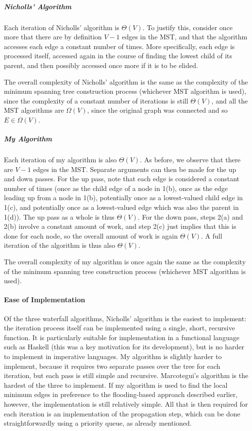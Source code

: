 \subparagraph{Nicholls' Algorithm}

Each iteration of Nicholls' algorithm is $\Theta(V)$. To justify this, consider once more that there are by definition $V - 1$ edges in the MST, and that the algorithm accesses each edge a constant number of times. More specifically, each edge is processed itself, accessed again in the course of finding the lowest child of its parent, and then possibly accessed once more if it is to be elided.

The overall complexity of Nicholls' algorithm is the same as the complexity of the minimum spanning tree construction process (whichever MST algorithm is used), since the complexity of a constant number of iterations is still $\Theta(V)$, and all the MST algorithms are $\Omega(V)$, since the original graph was connected and so $E \in \Omega(V)$.

\subparagraph{My Algorithm}

Each iteration of my algorithm is also $\Theta(V)$. As before, we observe that there are $V - 1$ edges in the MST. Separate arguments can then be made for the up and down passes. For the up pass, note that each edge is considered a constant number of times (once as the child edge of a node in 1(b), once as the edge leading up from a node in 1(b), potentially once as a lowest-valued child edge in 1(c), and potentially once as a lowest-valued edge which was also the parent in 1(d)). The up pass as a whole is thus $\Theta(V)$. For the down pass, steps 2(a) and 2(b) involve a constant amount of work, and step 2(c) just implies that this is done for each node, so the overall amount of work is again $\Theta(V)$. A full iteration of the algorithm is thus also $\Theta(V)$.

The overall complexity of my algorithm is once again the same as the complexity of the minimum spanning tree construction process (whichever MST algorithm is used).

\paragraph{Ease of Implementation}

Of the three waterfall algorithms, Nicholls' algorithm is the easiest to implement: the iteration process itself can be implemented using a single, short, recursive function. It is particularly suitable for implementation in a functional language such as Haskell (this was a key motivation for its development), but is no harder to implement in imperative languages. My algorithm is slightly harder to implement, because it requires two separate passes over the tree for each iteration, but each pass is still simple and recursive. Marcotegui's algorithm is the hardest of the three to implement. If my algorithm is used to find the local minimum edges in preference to the flooding-based approach described earlier, however, the implementation is still relatively simple. All that is then required for each iteration is an implementation of the propagation step, which can be done straightforwardly using a priority queue, as already mentioned.


